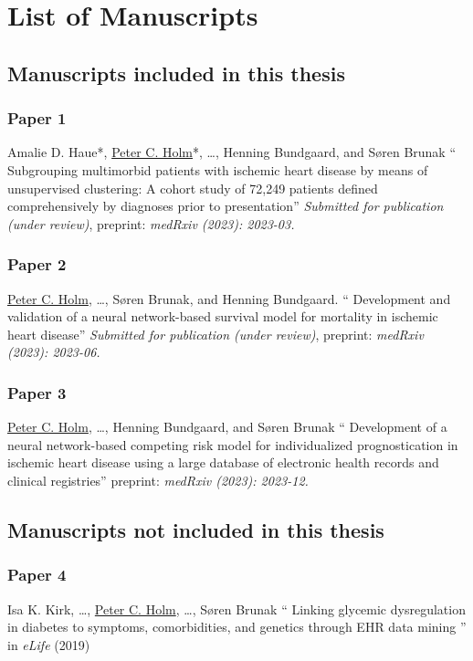 \chapter{List of Manuscripts}
\section{Manuscripts included in this thesis}
\subsection{Paper 1}
Amalie D. Haue*, 
\underline{Peter C. Holm}*, 
\ldots, Henning Bundgaard, and Søren Brunak
\enquote{%
    Subgrouping multimorbid patients with ischemic heart disease 
    by means of unsupervised clustering: 
    A cohort study of 72,249 patients 
    defined comprehensively by diagnoses prior to presentation}
\textit{Submitted for publication (under review)}, 
preprint: \textit{medRxiv (2023): 2023-03.}

\subsection{Paper 2}
\underline{Peter C. Holm},
\ldots, Søren Brunak, and Henning Bundgaard. 
\enquote{%
    Development and validation of a neural network-based survival model 
    for mortality in ischemic heart disease}
\textit{Submitted for publication (under review)}, 
preprint: \textit{medRxiv (2023): 2023-06.}

\subsection{Paper 3}
\underline{Peter C. Holm},
\ldots, Henning Bundgaard, and Søren Brunak
\enquote{%
    Development of a neural network-based competing risk model 
    for individualized prognostication in ischemic heart disease 
    using a large database of electronic health records 
    and clinical registries}
preprint: \textit{medRxiv (2023): 2023-12.}

\clearpage
\section{Manuscripts not included in this thesis}

\subsection{Paper 4}
Isa K. Kirk, \ldots, 
\underline{Peter C. Holm},
\ldots, Søren Brunak
\enquote{%
    Linking glycemic dysregulation in diabetes to symptoms, 
    comorbidities, and genetics through EHR data mining
}
in \textit{eLife} (2019)

